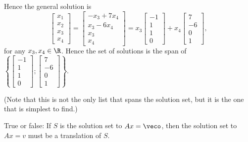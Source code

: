 {Hence the general solution is \[
\left[ \begin{array}{c} x_1 \\ x_2 \\ x_3 \\ x_4 \end{array}\right] = 
\left[ \begin{array}{c} -x_3 + 7x_4 \\ x_3 - 6x_4 \\ x_3 \\ x_4 \end{array}\right] = 
x_3 \left[ \begin{array}{c} -1 \\ 1 \\ 1 \\ 0 \end{array}\right] + 
x_4 \left[ \begin{array}{c} 7 \\ - 6 \\ 0 \\ 1 \end{array}\right],
\]
for any $x_3,x_4 \in \R$.  Hence the set of solutions is the span of  
$\left\{ \left[ \begin{array}{c} -1 \\ 1 \\ 1 \\ 0 \end{array} \right]; 
\left[ \begin{array}{c} 7 \\ -6 \\ 0 \\ 1 \end{array} \right]\right\}.$

(Note that this is not the only list that spans the solution set, but it is the one that is simplest to find.)

}


\endedxproblem





     

True or false: If $S$ is the solution set to $Ax = \veco$, then the solution set to 
$Ax = v$ must be a translation of $S$.  




